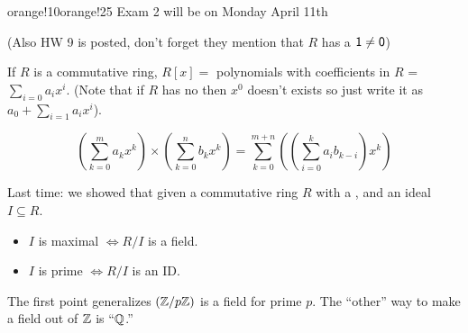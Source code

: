 \documentclass[notes.tex]{subfiles}
\begin{document}
\begin{classnote}{orange!10}{orange!25}
	Exam 2 will be on Monday April 11th

	(Also HW 9 is posted, don't forget they mention that $R$ has a $\mathsf{1}\ne\mathsf{0}$)
\end{classnote}

\begin{defn}
	If $R$ is a commutative ring, $R[x] = $ polynomials with coefficients in $R$ = $\sum_{i=0}a_ix^i$. (Note that if $R$ has no \one then $x^0$ doesn't exists so just write it as $a_0 + \sum_{i=1}a_ix^i$).
\end{defn}

\begin{property}
	\[
		\left(\sum_{k=0}^ma_kx^k\right)
		\times\left(\sum_{k=0}^nb_kx^k\right) 
		= \sum_{k=0}^{m+n}\left(\left(\sum_{i=0}^ka_ib_{k-i}\right)x^k\right)
	\]
\end{property}

Last time: we showed that given a commutative ring $R$ with a \one, and an ideal $I\subseteq R$.
\begin{itemize}
	\item $I$ is maximal $\iff R/I$ is a field.
	\item $I$ is prime $\iff R/I$ is an ID.
\end{itemize}
The first point generalizes $(\mathbb{Z}/{p}\mathbb{Z})$ is a field for prime $p$.
The ``other'' way to make a field out of $\mathbb{Z}$ is ``$\mathbb{Q}$.''
\end{document}
